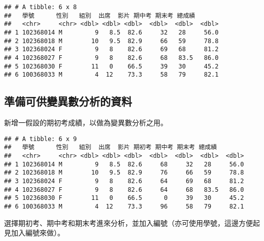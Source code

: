 \documentclass[
]{book}
\newenvironment{Shaded}{\begin{snugshade}}{\end{snugshade}}
\newcommand{\AttributeTok}[1]{\textcolor[rgb]{0.77,0.63,0.00}{#1}}
\newcommand{\DecValTok}[1]{\textcolor[rgb]{0.00,0.00,0.81}{#1}}
\newcommand{\FunctionTok}[1]{\textcolor[rgb]{0.00,0.00,0.00}{#1}}
\newcommand{\NormalTok}[1]{#1}
\newcommand{\OtherTok}[1]{\textcolor[rgb]{0.56,0.35,0.01}{#1}}
\newcommand{\SpecialCharTok}[1]{\textcolor[rgb]{0.00,0.00,0.00}{#1}}
\begin{document}
\begin{verbatim}
## # A tibble: 6 x 8
##   學號      性別   組別  出席  影片 期中考 期末考 總成績
##   <chr>     <chr> <dbl> <dbl> <dbl>  <dbl>  <dbl>  <dbl>
## 1 102368014 M         9   8.5  82.6     32   28     56.0
## 2 102368018 M        10   9.5  82.9     66   59     78.8
## 3 102368024 F         9   8    82.6     69   68     81.2
## 4 102368027 F         9   8    82.6     68   83.5   86.0
## 5 102368030 F        11   0    66.5     39   30     45.2
## 6 100368033 M         4  12    73.3     58   79     82.1
\end{verbatim}

\hypertarget{ux6e96ux5099ux53efux4f9bux8b8aux7570ux6578ux5206ux6790ux7684ux8cc7ux6599}{%
\subsection{準備可供變異數分析的資料}\label{ux6e96ux5099ux53efux4f9bux8b8aux7570ux6578ux5206ux6790ux7684ux8cc7ux6599}}

新增一假設的期初考成績，以做為變異數分析之用。

\begin{Shaded}
\end{Shaded}

\begin{verbatim}
## # A tibble: 6 x 9
##   學號      性別   組別  出席  影片 期初考 期中考 期末考 總成績
##   <chr>     <chr> <dbl> <dbl> <dbl>  <dbl>  <dbl>  <dbl>  <dbl>
## 1 102368014 M         9   8.5  82.6     68     32   28     56.0
## 2 102368018 M        10   9.5  82.9     76     66   59     78.8
## 3 102368024 F         9   8    82.6     64     69   68     81.2
## 4 102368027 F         9   8    82.6     64     68   83.5   86.0
## 5 102368030 F        11   0    66.5      0     39   30     45.2
## 6 100368033 M         4  12    73.3     96     58   79     82.1
\end{verbatim}

選擇期初考、期中考和期末考進來分析，並加入編號（亦可使用學號，這邊方便起見加入編號來做）。
\end{document}
